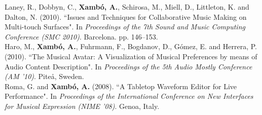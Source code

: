 \documentclass[10pt, a4paper]{article}
\newcommand{\years}[1]{\marginnote{\scriptsize #1}}
\begin{document}
{{\years{2010b}Laney, R., Dobbyn, C., \textbf{Xambó, A.}, Schirosa, M., Miell, D., Littleton, K. and Dalton, N. (2010). “Issues and Techniques for Collaborative Music Making on Multi-touch Surfaces". In \emph{Proceedings of the 7th Sound and Music Computing Conference (SMC 2010)}. Barcelona. pp. 146–153.\\
\years{2010a}Haro, M., \textbf{Xambó, A.}, Fuhrmann, F., Bogdanov, D., Gómez, E. and Herrera, P. (2010). “The Musical Avatar: A Visualization of Musical Preferences by means of Audio Content Description". In \emph{Proceedings of the 5th Audio Mostly Conference (AM '10)}. Piteå, Sweden.\\
\years{2008}Roma, G. and \textbf{Xambó, A.} (2008). “A Tabletop Waveform Editor for Live Performance". In \emph{Proceedings of the International Conference on New Interfaces for Musical Expression (NIME '08)}. Genoa, Italy.

}}
\end{document}

